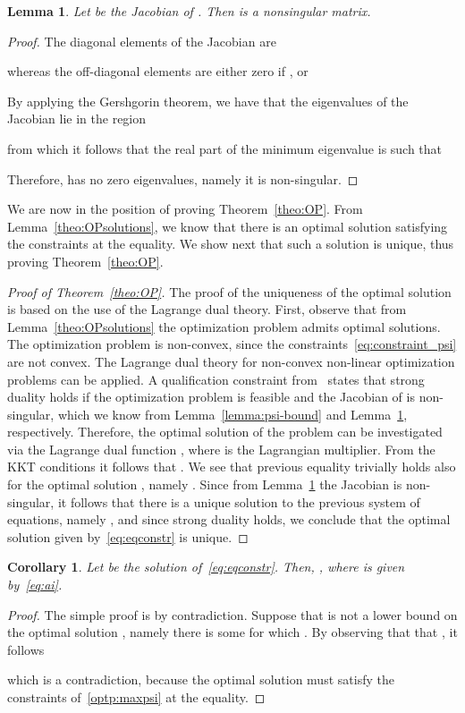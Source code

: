 \documentclass[a4paper,notitlepage,onecolumn]{article}
\newtheorem{corollary}[theorem]{Corollary}
\newtheorem{lemma}[theorem]{Lemma}
\numberwithin{equation}{section}
\begin{document}
\begin{lemma} \label{lemma:Jacob}
Let  be the Jacobian of . Then  is a nonsingular matrix.
\end{lemma}
\begin{proof}
The diagonal elements of the Jacobian are

whereas the off-diagonal elements  are either
zero if , or

By applying the Gershgorin theorem, we have that the eigenvalues of the Jacobian lie in the region

from which it follows that the real part of the minimum eigenvalue is such that

Therefore,  has no zero eigenvalues, namely it is non-singular.
\end{proof}

We are now in the position of proving Theorem~\ref{theo:OP}. From
Lemma~\ref{theo:OPsolutions}, we know that there is an optimal
solution satisfying the constraints at the equality. We show next
that such a solution is unique, thus proving
Theorem~\ref{theo:OP}.
\begin{proof}[Proof of Theorem~\ref{theo:OP}]
The proof of the uniqueness of the optimal solution is based on
the use of the Lagrange dual theory. First, observe that from
Lemma~\ref{theo:OPsolutions} the optimization problem admits
optimal solutions. The optimization problem is non-convex, since
the constraints~\eqref{eq:constraint_psi} are not convex. The
Lagrange dual theory for non-convex non-linear optimization
problems can be applied. A qualification constraint
from~\cite[pag. 25]{Horst+} states that strong duality holds if
the optimization problem is feasible and the Jacobian of
 is non-singular, which we know from
Lemma~\ref{lemma:psi-bound} and Lemma~\ref{lemma:Jacob},
respectively. Therefore, the optimal solution of the problem can
be investigated via the Lagrange dual function , where  is the
Lagrangian multiplier. From the KKT conditions it follows that
. We see that previous equality trivially
holds also for the optimal solution , namely
. Since from Lemma~\ref{lemma:Jacob}
the Jacobian is non-singular, it follows that there is a unique
solution to the previous system of equations, namely
, and since strong duality holds, we
conclude that the optimal solution given by~\eqref{eq:eqconstr} is
unique.
\end{proof}

\begin{corollary} \label{cor:lower-bound-opt-sol}
Let  be the solution of~\ref{eq:eqconstr}. Then,
, where  is given
by~\eqref{eq:ai}.
\end{corollary}
\begin{proof}
The simple proof is by contradiction. Suppose that  is not a lower bound on the optimal solution , namely there is some  for which . By observing that that , it follows

which is a contradiction, because the optimal solution must satisfy the constraints of~\ref{optp:maxpsi} at the equality.
\end{proof}
\end{document}
